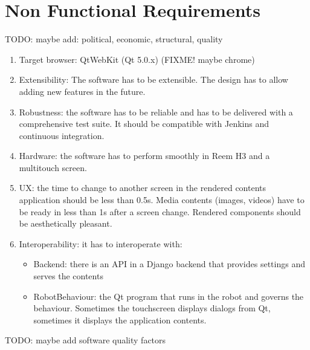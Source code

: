 \section{Non Functional Requirements}
TODO: maybe add: political, economic, structural, quality
\begin{enumerate}
    \item Target browser: QtWebKit (Qt 5.0.x) (FIXME! maybe chrome)
    \item Extensibility: The software has to be extensible. The design has to allow adding new features in the future.
    \item Robustness: the software has to be reliable and has to be delivered with a comprehensive test suite. It should be compatible with Jenkins and continuous integration.
    \item Hardware: the software has to perform smoothly in Reem H3 and a multitouch screen.
    \item \ac{UX}: the time to change to another screen in the rendered contents application should be less than 0.5s. Media contents (images, videos) have to be ready in less than 1s after a screen change. Rendered components should be aesthetically pleasant.
    \item Interoperability: it has to interoperate with:
    \begin{itemize}
        \item Backend: there is an \ac{API} in a Django backend that provides settings and serves the contents
        \item RobotBehaviour: the Qt program that runs in the robot and governs the behaviour. Sometimes the touchscreen displays dialogs from Qt, sometimes it displays the application contents. 
    \end{itemize}
\end{enumerate}

TODO: maybe add software quality factors